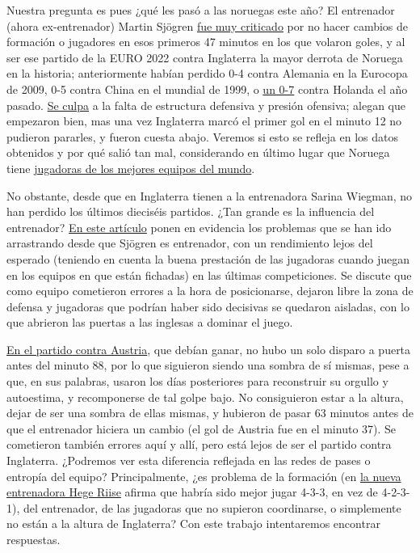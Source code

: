 Nuestra pregunta es pues ¿qué les pasó a las noruegas este año? El entrenador (ahora ex-entrenador) Martin Sjögren 
\href{https://www.nrk.no/sport/massiv-kritikk-mot-sjogren-etter-tidenes-storste-norge-tap-1.16034807}{fue muy 
criticado} por no hacer cambios de formación o jugadores en esos primeros 47 minutos en los que volaron goles, 
y al ser ese partido de la EURO 2022 contra Inglaterra la mayor derrota de Noruega en la historia; anteriormente 
habían perdido 0-4 contra Alemania en la Eurocopa de 2009, 0-5 contra China en el mundial de 1999, o 
\href{https://www.nrk.no/sport/norges-landslag-knust-av-nederland--1.15538927}{un 0-7} contra Holanda el año pasado.
\href{https://www.nrk.no/sport/norge-mareritt-mot-england-i-em_-_-dette-er-direkte-pinlig-1.16034607}{Se culpa} a la 
falta de estructura defensiva y presión ofensiva; alegan que empezaron bien, mas una vez Inglaterra marcó el primer gol en 
el minuto 12 no pudieron pararles, y fueron cuesta abajo. Veremos si esto se refleja en los datos obtenidos y por qué 
salió tan mal, considerando en último lugar que Noruega tiene 
\href{https://www.nrk.no/sport/engelsk-forbauselse_-_-jeg-kan-ikke-helt-tro-det-jeg-nettopp-har-vaert-vitne-til-1.16034919}{
jugadoras de los mejores equipos del mundo}. 

No obstante, desde que en Inglaterra tienen a la entrenadora Sarina Wiegman, no 
han perdido los últimos dieciséis partidos. ¿Tan grande es la influencia del entrenador? 
\href{https://www.nrk.no/sport/hvis-det-er-en-plan_-er-den-usynlig-1.16038718}{En este artículo} ponen en evidencia los problemas 
que se han ido arrastrando desde que Sjögren es entrenador, con un rendimiento lejos del esperado (teniendo en 
cuenta la buena prestación de las jugadoras cuando juegan en los equipos en que están fichadas) en las últimas 
competiciones. Se discute que como equipo cometieron errores a la hora de posicionarse, dejaron libre la zona de 
defensa y jugadoras que podrían haber sido decisivas se quedaron aisladas, con lo que abrieron las puertas a 
las inglesas a dominar el juego. 

\href{https://www.nrk.no/sport/norsk-fiasko-i-em_-_-en-varslet-katastrofe-1.16039578}{En el partido contra Austria},
que debían ganar, no hubo un solo disparo a puerta antes del minuto 88, por lo que siguieron siendo una sombra de sí 
mismas, pese a que, en sus palabras, usaron los días posteriores para reconstruir su orgullo y autoestima, y recomponerse 
de tal golpe bajo. No consiguieron estar a la altura, dejar de ser una sombra de ellas mismas, y hubieron de pasar 
63 minutos antes de que el entrenador hiciera un cambio (el gol de Austria fue en el minuto 37). Se cometieron también 
errores aquí y allí, pero está lejos de ser el partido contra Inglaterra. ¿Podremos ver esta diferencia reflejada 
en las redes de pases o entropía del equipo? Principalmente, ¿es problema de la formación 
(en \href{https://www.nrk.no/sport/reiten-ut-mot-sjogren-grep_-_-pa-tide-med-noko-nytt-1.16085631}{la nueva 
entrenadora Hege Riise} afirma que habría sido mejor jugar 4-3-3, en vez de 4-2-3-1), del entrenador, de las 
jugadoras que no supieron coordinarse, o simplemente no están a la altura de Inglaterra? Con este trabajo intentaremos 
encontrar respuestas.

